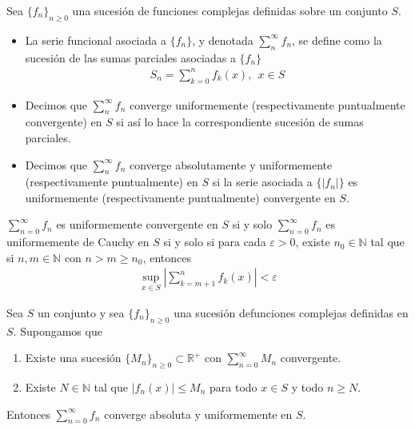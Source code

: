 \begin{defi}
    Sea $\{f_n\}_{n \ge 0}$ una sucesión de funciones complejas definidas sobre un conjunto $S$.
    \begin{itemize}
        \item La serie funcional asociada a $\{f_n\}$, y denotada $\sum_{n}^{\infty}{f_n}$, se define como la sucesión de las sumas parciales asociadas a $\{f_n\}$
              \begin{align*}
                  S_n = \sum_{k=0}^{n}{f_k(x)}, \ \ x \in S
              \end{align*}
        \item Decimos que $\sum_{n}^{\infty}{f_n}$ converge uniformemente (respectivamente puntualmente convergente) en $S$ si así lo hace la correspondiente sucesión de sumas parciales.
        \item Decimos que $\sum_{n}^{\infty}{f_n}$ converge absolutamente y uniformemente (respectivamente puntualmente) en $S$ si la serie asociada a $\{|f_n|\}$ es uniformemente (respectivamente puntualmente) convergente en $S$.
    \end{itemize}
\end{defi}

\begin{teo}
    $\sum_{n=0}^{\infty}{f_n}$ es uniformemente convergente en $S$ si y solo $\sum_{n=0}^{\infty}{f_n}$ es uniformemente de Cauchy en $S$ si y solo si para cada $\varepsilon > 0$, existe $n_0 \in \mathbb{N}$ tal que si $n,m \in \mathbb{N}$ con $n > m \ge n_0$, entonces
    \begin{align*}
        \sup_{x \in S}{\left| \sum_{k=m+1}^{n}{f_k(x)}\right|} < \varepsilon
    \end{align*}
\end{teo}

\begin{prop}
    Sea $S$ un conjunto y sea $\{f_n\}_{n \ge 0}$ una sucesión defunciones complejas definidas en $S$. Supongamos que
    \begin{enumerate}
        \item Existe una sucesión $\{M_n\}_{n \ge 0} \subset \mathbb{R}^+$ con $\sum_{n = 0}^{\infty}{M_n}$ convergente.
        \item Existe $N \in \mathbb{N}$ tal que $|f_n(x)| \leq M_n$ para todo $x \in S$ y todo $n \ge N$.
    \end{enumerate}
    Entonces $\sum_{n=0}^{\infty}{f_n}$ converge absoluta y uniformemente en $S$.
\end{prop}

